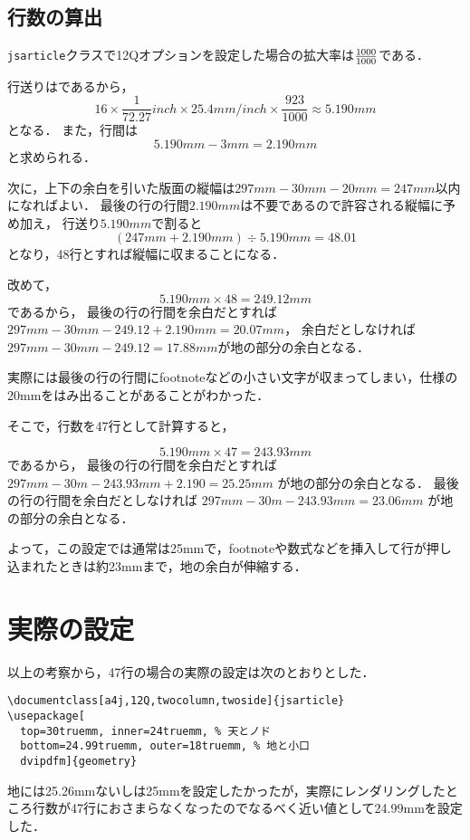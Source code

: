 \documentclass[a4j, 12Q, twocolumn, twoside]{jsarticle}
\begin{document}
  \subsection{行数の算出}
  \texttt{jsarticle}クラスで12Qオプションを設定した場合の拡大率は$\frac{\the\mag}{1000}$である．

  行送りは\the\baselineskip であるから，
　　\[ 16 \times \frac{1}{72.27} inch \times 25.4 mm/inch \times \frac{923}{1000} \approx 5.190 mm \]
  となる．
  また，行間は
  \[ 5.190 mm - 3 mm = 2.190 mm \]
  と求められる．
  
  次に，上下の余白を引いた版面の縦幅は$297mm - 30mm - 20mm = 247mm$以内になればよい．
  最後の行の行間$2.190mm$は不要であるので許容される縦幅に予め加え，
  行送り$5.190mm$で割ると
  \[ (247mm + 2.190mm )\div 5.190mm = 48.01 \]
  となり，48行とすれば縦幅に収まることになる．
  
  改めて，
  \[ 5.190mm \times 48 = 249.12mm \]
  であるから，
  最後の行の行間を余白だとすれば
  $297mm -30mm - 249.12 + 2.190mm = 20.07mm$，
  余白だとしなければ
  $297mm -30mm - 249.12 = 17.88mm$が地の部分の余白となる．
  
  実際には最後の行の行間にfootnoteなどの小さい文字が収まってしまい，仕様の20mmをはみ出ることがあることがわかった．
  
  そこで，行数を47行として計算すると，
  
  \[ 5.190mm \times 47 = 243.93mm \]
  であるから，
  最後の行の行間を余白だとすれば
  $297 mm - 30 m - 243.93mm + 2.190 = 25.25 mm$
  が地の部分の余白となる．
  最後の行の行間を余白だとしなければ
  $297 mm - 30 m - 243.93mm = 23.06 mm$
  が地の部分の余白となる．

  よって，この設定では通常は25mmで，footnoteや数式などを挿入して行が押し込まれたときは約23mmまで，地の余白が伸縮する．
  
\section{実際の設定}

  以上の考察から，47行の場合の実際の設定は次のとおりとした．

{\small
\begin{verbatim}
\documentclass[a4j,12Q,twocolumn,twoside]{jsarticle}
\usepackage[
  top=30truemm, inner=24truemm, % 天とノド
  bottom=24.99truemm, outer=18truemm, % 地と小口
  dvipdfm]{geometry}
\end{verbatim}
}

  地には25.26mmないしは25mmを設定したかったが，実際にレンダリングしたところ行数が47行におさまらなくなったのでなるべく近い値として24.99mmを設定した．
  
\end{document}
